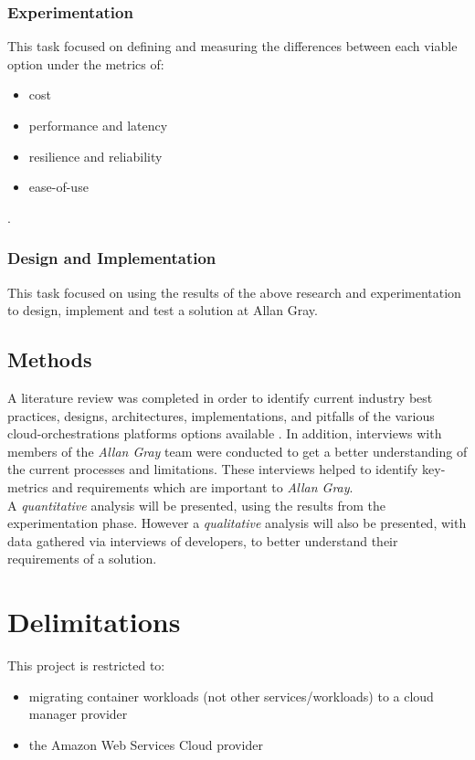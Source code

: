 \subsection{Experimentation}
This task focused on defining and measuring the differences between each viable option under the metrics of:
\begin{itemize}
  \item cost
  \item performance and latency
  \item resilience and reliability
  \item ease-of-use
\end{itemize}.
\subsection{Design and Implementation}
This task focused on using the results of the above research and experimentation to design, implement and test a solution at Allan Gray.

\section{Methods}
A literature review was completed in order to identify current industry best practices, designs, architectures, implementations, and
pitfalls of the various cloud-orchestrations platforms options available .
In addition, interviews with members of the \textit{Allan Gray} team were conducted to get a better understanding of the current processes and limitations.
These interviews helped to identify key-metrics and requirements which are important to \textit{Allan Gray}. \\

\noindent A \textit{quantitative} analysis will be presented, using the results from the experimentation phase.
However a \textit{qualitative} analysis will also be presented, with data gathered via interviews of developers, to better understand their requirements of a solution.

\chapter{Delimitations}
This project is restricted to:
\begin{itemize}
  \item migrating container workloads (not other services/workloads) to a cloud manager provider
  \item the Amazon Web Services Cloud provider
\end{itemize}

